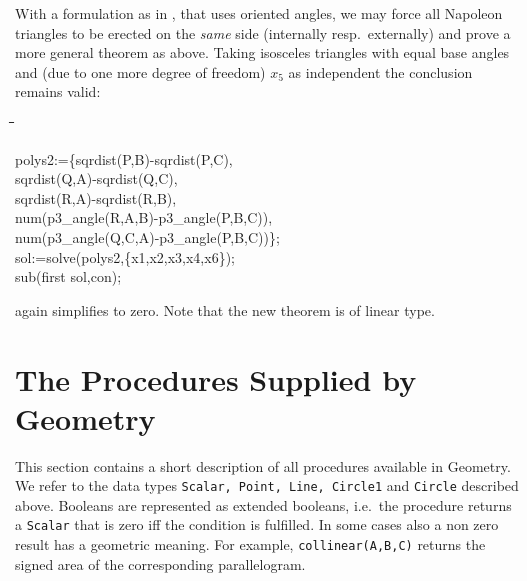 \documentclass{article}
\newenvironment{code}{\tt \begin{tabbing}
\hspace*{1cm}\=\hspace*{1cm}\=\hspace*{1cm}\=
\hspace*{1cm}\=\hspace*{1cm}\=\kill
}{\end{tabbing}}
\newcommand{\geo}{{\sc Geometry}}
\begin{document}
With a formulation as in \cite[p.~123]{Chou:88}, that uses oriented
angles, we may force all Napoleon triangles to be erected on the {\em
same} side (internally resp.\ externally) and prove a more general
theorem as above. Taking isosceles triangles with equal base angles
and (due to one more degree of freedom) $x_5$ as independent the
conclusion remains valid:
\begin{code}
polys2:=\{\>\>sqrdist(P,B)-sqrdist(P,C),\+\+\\ 
	sqrdist(Q,A)-sqrdist(Q,C),  \\
	sqrdist(R,A)-sqrdist(R,B), \\
	num(p3\_angle(R,A,B)-p3\_angle(P,B,C)), \\
	num(p3\_angle(Q,C,A)-p3\_angle(P,B,C))\};\-\-\\[6pt]

sol:=solve(polys2,\{x1,x2,x3,x4,x6\});\\
sub(first sol,con);
\end{code}
again simplifies to zero. Note that the new theorem is of linear type.

\section{The Procedures Supplied by \geo}\label{description}

This section contains a short description of all procedures available
in \geo. We refer to the data types {\tt Scalar, Point, Line, Circle1}
and {\tt Circle} described above. Booleans are represented as extended
booleans, i.e.\ the procedure returns a {\tt Scalar} that is zero iff
the condition is fulfilled. In some cases also a non zero result has a
geometric meaning. For example, {\tt collinear(A,B,C)} returns the
signed area of the corresponding parallelogram.
\bigskip
\end{document}
